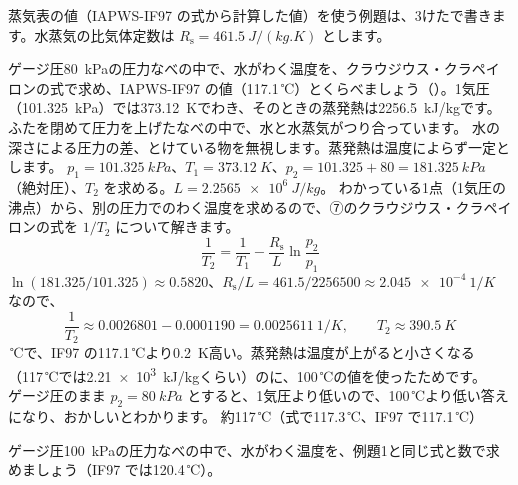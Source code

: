 {}

\noindent 蒸気表の値（IAPWS-IF97 の式から計算した値）を使う例題は、3けたで書きます。水蒸気の比気体定数は $R_{\mathrm s}=\qty{461.5}{J/(kg.K)}$ とします。

\label{ph:熱-10:ex1}
\begin{phreidai}
ゲージ圧\qty{80}{kPa}の圧力なべの中で、水がわく温度を、クラウジウス・クラペイロンの式で求め、IAPWS-IF97 の値（117.1\,℃）とくらべましょう（\bkhatenaref）。1気圧（\qty{101.325}{kPa}）では\qty{373.12}{K}でわき、そのときの蒸発熱は\qty{2256.5}{kJ/kg}です。
\phbamen
ふたを閉めて圧力を上げたなべの中で、水と水蒸気がつり合っています。
\phmushi
水の深さによる圧力の差、とけている物を無視します。蒸発熱は温度によらず一定とします。
\phzu
$p_1=\qty{101.325}{kPa}$、$T_1=\qty{373.12}{K}$、$p_2=101.325+80=\qty{181.325}{kPa}$（絶対圧）、$T_2$ を求める。$L=\qty{2.2565e6}{J/kg}$。
\phriyu
わかっている1点（1気圧の沸点）から、別の圧力でのわく温度を求めるので、⑦のクラウジウス・クラペイロンの式を $1/T_2$ について解きます。
\phtateru
\[\frac{1}{T_2}=\frac{1}{T_1}-\frac{R_{\mathrm s}}{L}\ln\frac{p_2}{p_1}\]
\phtoku
$\ln(181.325/101.325)\approx0.5820$、$R_{\mathrm s}/L=461.5/2256500\approx\qty{2.045e-4}{1/K}$ なので、
\[\frac{1}{T_2}\approx0.0026801-0.0001190=\qty{0.0025611}{1/K},\qquad T_2\approx\qty{390.5}{K}\]
\,℃で、IF97 の117.1\,℃より\qty{0.2}{K}高い。蒸発熱は温度が上がると小さくなる（117\,℃では\qty{2.21e3}{kJ/kg}くらい）のに、100\,℃の値を使ったためです。\\
ゲージ圧のまま $p_2=\qty{80}{kPa}$ とすると、1気圧より低いので、100\,℃より低い答えになり、おかしいとわかります。
\kotae 約117\,℃（式で117.3\,℃、IF97 で117.1\,℃）
\end{phreidai}
\begin{jibun}
ゲージ圧\qty{100}{kPa}の圧力なべの中で、水がわく温度を、例題1と同じ式と数で求めましょう（IF97 では120.4\,℃）。
\end{jibun}

